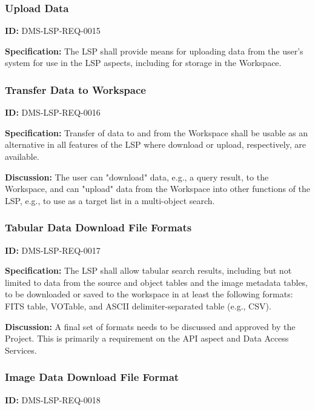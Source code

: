 \documentclass[SE,toc]{lsstdoc}
\begin{document}
\subsubsection{Upload Data}

\label{DMS-LSP-REQ-0015}
\textbf{ID:} DMS-LSP-REQ-0015

\textbf{Specification:}
The LSP shall provide means for uploading data from the user's system for use in the LSP aspects, including for storage in the Workspace.

\subsubsection{Transfer Data to Workspace}

\label{DMS-LSP-REQ-0016}
\textbf{ID:} DMS-LSP-REQ-0016

\textbf{Specification:}
Transfer of data to and from the Workspace shall be usable as an alternative in all features of the LSP where download or upload, respectively, are available.

\textbf{Discussion:}
The user can "download" data, e.g., a query result, to the Workspace, and can "upload" data from the Workspace into other functions of the LSP, e.g., to use as a target list in a multi-object search.

\subsubsection{Tabular Data Download File Formats}

\label{DMS-LSP-REQ-0017}
\textbf{ID:} DMS-LSP-REQ-0017

\textbf{Specification:}
The LSP shall allow tabular search results, including but not limited to data from the source and object tables and the image metadata tables, to be downloaded or saved to the workspace in at least the following formats: FITS table, VOTable, and ASCII delimiter-separated table (e.g., CSV).

\textbf{Discussion:}
A final set of formats needs to be discussed and approved by the Project.
This is primarily a requirement on the API aspect and Data Access Services.

\subsubsection{Image Data Download File Format}

\label{DMS-LSP-REQ-0018}
\textbf{ID:} DMS-LSP-REQ-0018
\end{document}
